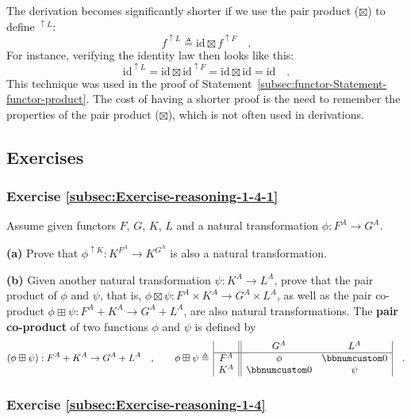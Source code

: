 The derivation becomes significantly shorter if we use the pair product
($\boxtimes$) to define $^{\uparrow L}$:
\[
f^{\uparrow L}\triangleq\text{id}\boxtimes f^{\uparrow F}\quad.
\]
For instance, verifying the identity law then looks like this:
\[
\text{id}^{\uparrow L}=\text{id}\boxtimes\text{id}^{\uparrow F}=\text{id}\boxtimes\text{id}=\text{id}\quad.
\]
This technique was used in the proof of Statement~\ref{subsec:functor-Statement-functor-product}.
The cost of having a shorter proof is the need to remember the properties
of the pair product ($\boxtimes$), which is not often used in derivations.

\subsection{Exercises}

\subsubsection{Exercise \label{subsec:Exercise-reasoning-1-4-1}\ref{subsec:Exercise-reasoning-1-4-1}}

Assume given functors $F$, $G$, $K$, $L$ and a natural transformation
$\phi:F^{A}\rightarrow G^{A}$.

\textbf{(a)} Prove that $\phi^{\uparrow K}:K^{F^{A}}\rightarrow K^{G^{A}}$
is also a natural transformation.

\textbf{(b)} Given another natural transformation $\psi:K^{A}\rightarrow L^{A}$,
prove that the pair product of $\phi$ and $\psi$, that is, $\phi\boxtimes\psi:F^{A}\times K^{A}\rightarrow G^{A}\times L^{A}$,
as well as the pair co-product $\phi\boxplus\psi:F^{A}+K^{A}\rightarrow G^{A}+L^{A}$,
are also natural transformations. The \textbf{pair co-product}
of two functions $\phi$ and $\psi$ is defined by
\[
(\phi\boxplus\psi):F^{A}+K^{A}\rightarrow G^{A}+L^{A}\quad,\quad\quad\phi\boxplus\psi\triangleq\,\begin{array}{|c||cc|}
 & G^{A} & L^{A}\\
\hline F^{A} & \phi & \bbnum 0\\
K^{A} & \bbnum 0 & \psi
\end{array}\quad.
\]


\subsubsection{Exercise \label{subsec:Exercise-reasoning-1-4}\ref{subsec:Exercise-reasoning-1-4}}

